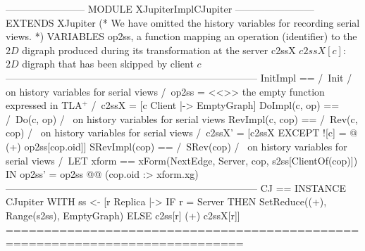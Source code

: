 \documentclass[preview, border={5pt 0pt 42pt 1pt}]{standalone}
\begin{document}
\begin{tla}
------------------------ MODULE XJupiterImplCJupiter ------------------------
EXTENDS XJupiter
(* We have omitted the history variables for recording serial views. *) 
VARIABLES op2ss, \* a function mapping an operation (identifier)
                 \* to the $2D$ digraph produced during its transformation at the server
          c2ssX  \* $c2ssX[c]$: $2D$ digraph that has been skipped by client $c$
-----------------------------------------------------------------------------
InitImpl == /\ Init 
            /\ \* on history variables for serial views
            /\ op2ss = <<>> \* the empty function expressed in TLA$^{+}$
            /\ c2ssX = [c \in Client |-> EmptyGraph]
DoImpl(c, op) == /\ Do(c, op)
                 /\ \* on history variables for serial views
RevImpl(c, cop) == /\ Rev(c, cop) 
                   /\ \* on history variables for serial views
                   /\ c2ssX' = [c2ssX EXCEPT ![c] = @ (+) op2ss[cop.oid]] 
SRevImpl(cop) == /\ SRev(cop) 
                 /\ \* on history variables for serial views
                 /\ LET xform == xForm(NextEdge, Server, cop, s2ss[ClientOf(cop)])
                    IN op2ss' = op2ss @@ (cop.oid :> xform.xg)
-----------------------------------------------------------------------------
CJ == INSTANCE CJupiter WITH ss <- [r \in Replica |->
                   IF r = Server THEN SetReduce((+), Range(s2ss), EmptyGraph)
                                 ELSE c2ss[r] (+) c2ssX[r]]
=============================================================================
\end{tla}
\end{document}
